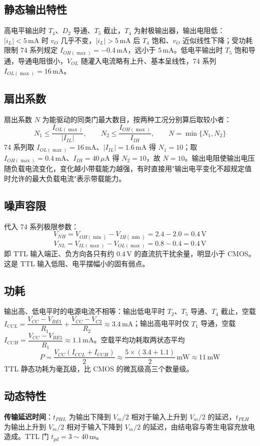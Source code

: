 \subsection{静态输出特性}
高电平输出时 \(T_4\)、\(D_2\) 导通、\(T_5\) 截止，\(T_4\) 为射极输出器，输出电阻低：\(|i_L|<5\,\mathrm{mA}\) 时 \(v_O\) 几乎不变，\(|i_L|>5\,\mathrm{mA}\) 后 \(T_4\) 饱和、\(v_O\) 近似线性下降；受功耗限制 74 系列规定 \(I_{OH(\max)}=-0.4\,\mathrm{mA}\)，远小于 \(5\,\mathrm{mA}\)。低电平输出时 \(T_5\) 饱和导通，导通电阻很小，\(V_{OL}\) 随灌入电流略有上升、基本呈线性，74 系列 \(I_{OL(\max)}=16\,\mathrm{mA}\)。

\subsection{扇出系数}
扇出系数 \(N\) 为能驱动的同类门最大数目，按两种工况分别算后取较小者：
\[
N_1\le\frac{I_{OL(\max)}}{|I_{IL}|},\qquad
N_2\le\frac{I_{OH(\max)}}{I_{IH}},\qquad
N=\min\{N_1,N_2\}
\]
74 系列取 \(I_{OL(\max)}=16\,\mathrm{mA}\)、\(|I_{IL}|=1.6\,\mathrm{mA}\) 得 \(N_1=10\)；取 \(I_{OH(\max)}=0.4\,\mathrm{mA}\)、\(I_{IH}=40\,\mu\mathrm{A}\) 得 \(N_2=10\)，故 \(N=10\)。输出电阻使输出电压随负载电流变化，变化越小带载能力越强，有时直接用"输出电平变化不超规定值时允许的最大负载电流"表示带载能力。

\subsection{噪声容限}
代入 74 系列极限参数：
\[
V_{NH}=V_{OH(\min)}-V_{IH(\min)}=2.4-2.0=0.4\,\mathrm{V}
\]
\[
V_{NL}=V_{IL(\max)}-V_{OL(\max)}=0.8-0.4=0.4\,\mathrm{V}
\]
即 TTL 输入端正、负方向各只有约 \(0.4\,\mathrm{V}\) 的直流抗干扰余量，明显小于 CMOS。这是 TTL 输入低阻、电平摆幅小的固有弱点。

\subsection{功耗}
输出高、低电平时的电源电流不相等：输出低电平时 \(T_2\)、\(T_5\) 导通、\(T_4\) 截止，空载
\(I_{CCL}=\dfrac{V_{CC}-V_{BE1}}{R_1}+\dfrac{V_{CC}-V_{C2}}{R_2}\approx3.4\,\mathrm{mA}\)；输出高电平时仅 \(T_1\) 导通，空载
\(I_{CCH}=\dfrac{V_{CC}-V_{BE1}}{R_1}\approx1.1\,\mathrm{mA}\)。空载平均功耗取两状态平均
\[
P=\frac{V_{CC}\left(I_{CCL}+I_{CCH}\right)}{2}\approx\frac{5\times(3.4+1.1)}{2}\,\mathrm{mW}\approx11\,\mathrm{mW}
\]
TTL 静态功耗为毫瓦级，比 CMOS 的微瓦级高三个数量级。

\subsection{动态特性}
\textbf{传输延迟时间}：\(t_{PHL}\) 为输出下降到 \(V_m/2\) 相对于输入上升到 \(V_m/2\) 的延迟，\(t_{PLH}\) 为输出上升到 \(V_m/2\) 相对于输入下降到 \(V_m/2\) 的延迟，由结电容与寄生电容充放电造成。TTL 门 \(t_{pd}=3\sim40\,\mathrm{ns}\)。


